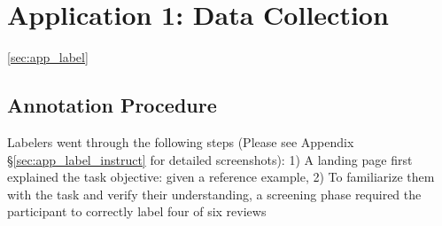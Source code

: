 \begin{comment}
* Labeling details
- UI, filtering strategy
- Statistics
- Payment
- Timing
- Effectiveness

* General model training
- roberta finetuning
- 4 random seeds
- 3 random samples

* Task 1 - sentiment analysis, generalization accuracy
- 
- 
- 

* Task 2 - NLI, challenge set

* Task 3 - QQP checklist

\end{comment}

\section{Application 1: Data Collection}
\ref{sec:app_label}

\subsection{Annotation Procedure}
Labelers went through the following steps (Please see Appendix \S\ref{sec:app_label_instruct} for detailed screenshots):
1) A landing page first explained the task objective: given a reference example, 
2) To familiarize them with the task and verify their understanding, a screening phase required the participant to correctly label four of six reviews



